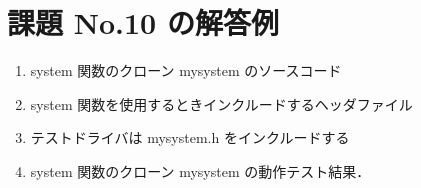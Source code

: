 \documentclass[a4j,twcolumn,11pt,nomag]{ltjarticle}      %
\begin{document}
\onecolumn

\section*{課題 No.10 の解答例}
\begin{enumerate}
\item system 関数のクローン mysystem のソースコード
\item system 関数を使用するときインクルードするヘッダファイル
\item テストドライバは mysystem.h をインクルードする
\newpage
\item system 関数のクローン mysystem の動作テスト結果．
\end{enumerate}
\end{document}
